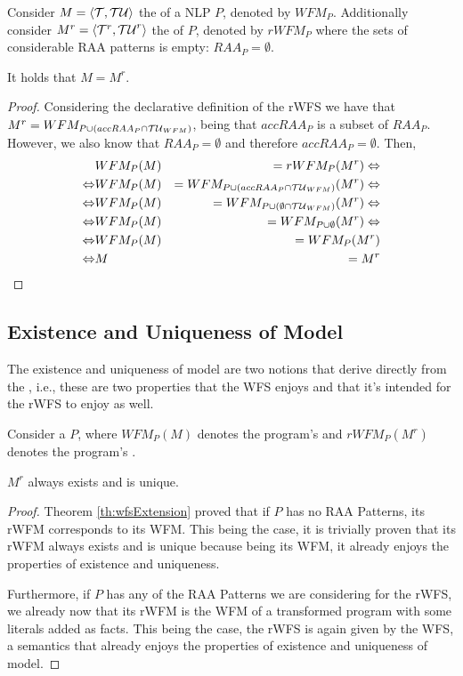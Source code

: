 \begin{theorem}
\label{th:wfsExtension}
Consider $M=\langle\cal{T},\cal{TU}\rangle$ the \wfm of a NLP $P$, denoted by $WFM_{P}$. Additionally consider $M^{r}=\langle{\cal{T}}^{r},{\cal{TU}}^{r}\rangle$ the \rwfm of $P$, denoted by $rWFM_{P}$ where the sets of considerable RAA patterns is empty: $RAA_{P}=\emptyset$.

It holds that $M = M^{r}$.

\begin{proof}
Considering the declarative definition of the rWFS we have that $M^{r} = WFM_{P\cup \left(accRAA_{P}\cap {\cal{TU}}_{WFM}\right)}$, being that $accRAA_{P}$ is a subset of $RAA_{P}$. However, we also know that $RAA_{P}=\emptyset$ and therefore $accRAA_{P}=\emptyset$. Then,
\begin{eqnarray}
								&WFM_{P}(M)& = rWFM_{P}(M^{r}) \Leftrightarrow\\
\Leftrightarrow	&WFM_{P}(M)& = WFM_{P\cup \left(accRAA_{P}\cap {\cal{TU}}_{WFM}\right)}(M^{r}) \Leftrightarrow\\
\Leftrightarrow	&WFM_{P}(M)& = WFM_{P\cup \left(\emptyset\cap {\cal{TU}}_{WFM}\right)}(M^{r})\Leftrightarrow\\
\Leftrightarrow	&WFM_{P}(M)& = WFM_{P\cup\emptyset}(M^{r}) \Leftrightarrow\\
\Leftrightarrow	&WFM_{P}(M)& = WFM_{P}(M^{r})\\
\Leftrightarrow	&M& = M^{r}
\end{eqnarray}
\end{proof}
\end{theorem}


\subsection{Existence and Uniqueness of Model}
The existence and uniqueness of model are two notions that derive directly from the \wfs, i.e., these are two properties that the WFS enjoys and that it's intended for the rWFS to enjoy as well.

\begin{theorem}
\label{th:existence}
Consider a \nlp $P$, where $WFM_{P}(M)$ denotes the program's \wfm and $rWFM_{P}(M^{r})$ denotes the program's \rwfm.

$M^{r}$ always exists and is unique.

\begin{proof}
Theorem \ref{th:wfsExtension} proved that if $P$ has no RAA Patterns, its rWFM corresponds to its WFM. This being the case, it is trivially proven that its rWFM always exists and is unique because being its WFM, it already enjoys the properties of existence and uniqueness.

Furthermore, if $P$ has any of the RAA Patterns we are considering for the rWFS, we already now that its rWFM is the WFM of a transformed program with some literals added as facts. This being the case, the rWFS is again given by the WFS, a semantics that already enjoys the properties of existence and uniqueness of model.
\end{proof}
\end{theorem}


